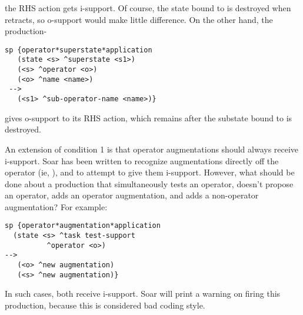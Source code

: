 the RHS action gets i-support. Of course, the state bound to  is destroyed when  retracts, so o-support would make little difference. On the other hand, the production- 

\begin{verbatim}
sp {operator*superstate*application
   (state <s> ^superstate <s1>)
   (<s> ^operator <o>)
   (<o> ^name <name>)
 -->
   (<s1> ^sub-operator-name <name>)}
\end{verbatim}

gives o-support to its RHS action, which remains after the substate bound to  is destroyed. 

An extension of condition 1 is that operator augmentations should always receive i-support. Soar has been written to recognize augmentations directly off the operator (ie, ), and to attempt to give them i-support. However, what should be done about a production that simultaneously tests an operator, doesn't propose an operator, adds an operator augmentation, and adds a non-operator augmentation? For example:

\begin{verbatim}
sp {operator*augmentation*application
  (state <s> ^task test-support
  	      ^operator <o>)
-->
   (<o> ^new augmentation)
   (<s> ^new augmentation)}
\end{verbatim}


In such cases, both receive i-support. Soar will print a warning on firing this production, because this is considered bad coding style.

